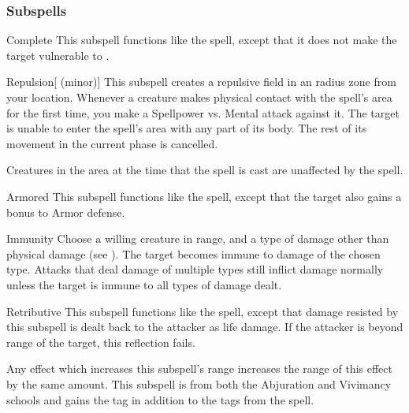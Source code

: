 \subsubsection{Subspells}


\begin{ability}[\nth{2}]{Complete}
This subspell functions like the  spell, except that it does not make the target vulnerable to .
\end{ability}
\vspace{0.25em}


\begin{ability}[\nth{2}]{Repulsion}[ (minor)]
This subspell creates a repulsive field in an \areamed radius zone from your location.
Whenever a creature makes physical contact with the spell's area for the first time, you make a Spellpower vs. Mental attack against it.
\hit The target is unable to enter the spell's area with any part of its body.
The rest of its movement in the current phase is cancelled.

Creatures in the area at the time that the spell is cast are unaffected by the spell.
\end{ability}
\vspace{0.25em}


\begin{ability}[\nth{4}]{Armored}
This subspell functions like the  spell, except that the target also gains a  bonus to Armor defense.
\end{ability}
\vspace{0.25em}


\begin{ability}[\nth{4}]{Immunity}
Choose a willing creature in \rngclose range, and a type of damage other than physical damage (see ).
The target becomes immune to damage of the chosen type.
Attacks that deal damage of multiple types still inflict damage normally unless the target is immune to all types of damage dealt.
\end{ability}
\vspace{0.25em}


\begin{ability}[\nth{4}]{Retributive}
This subspell functions like the  spell, except that damage resisted by this subspell is dealt back to the attacker as life damage.
If the attacker is beyond \rngclose range of the target, this reflection fails.

Any effect which increases this subspell's range increases the range of this effect by the same amount.
This subspell is from both the Abjuration and Vivimancy schools and gains the  tag in addition to the tags from the  spell.
\end{ability}
\vspace{0.25em}



